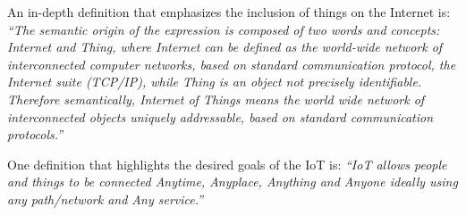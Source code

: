 \documentclass[english,version-2019-11]{uzl-thesis}
\begin{document}
An in-depth definition that emphasizes the inclusion of things
on the Internet is:
\emph{\enquote{The
semantic origin of the expression is composed of two words
and concepts: Internet and Thing, where Internet can be
defined as the world-wide network of interconnected
computer networks, based on standard communication
protocol, the Internet suite (TCP/IP), while Thing is an
object not precisely identifiable. Therefore semantically,
Internet of Things means the world wide network of interconnected
objects uniquely addressable, based on
standard communication protocols.}}~\cite{EuropeanCommission}

One definition that highlights the desired goals of the IoT is:
\emph{\enquote{IoT allows people and things to be connected
Anytime, Anyplace, Anything and Anyone ideally using any
path/network and Any service.}}~\cite{StrategicRoadmap}
\end{document}
